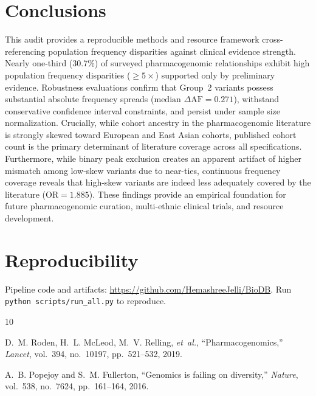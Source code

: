 \documentclass[conference]{IEEEtran}
\begin{document}
\begin{table}[!t]
\section{Conclusions}

This audit provides a reproducible methods and resource framework cross-referencing population frequency disparities against clinical evidence strength.
Nearly one-third (30.7\%) of surveyed pharmacogenomic relationships exhibit high population frequency disparities ($\ge 5\times$) supported only by preliminary evidence.
Robustness evaluations confirm that Group~2 variants possess substantial absolute frequency spreads ($\text{median } \Delta\text{AF} = 0.271$), withstand conservative confidence interval constraints, and persist under sample size normalization.
Crucially, while cohort ancestry in the pharmacogenomic literature is strongly skewed toward European and East Asian cohorts, published cohort count is the primary determinant of literature coverage across all specifications.
Furthermore, while binary peak exclusion creates an apparent artifact of higher mismatch among low-skew variants due to near-ties, continuous frequency coverage reveals that high-skew variants are indeed less adequately covered by the literature ($\text{OR} = 1.885$).
These findings provide an empirical foundation for future pharmacogenomic curation, multi-ethnic clinical trials, and resource development.

\section*{Reproducibility}

Pipeline code and artifacts: \url{https://github.com/HemashreeJelli/BioDB}.
Run \texttt{python scripts/run\_all.py} to reproduce.

\balance
\begin{thebibliography}{10}

D.~M. Roden, H.~L. McLeod, M.~V. Relling, \emph{et~al.},
``Pharmacogenomics,''
\emph{Lancet}, vol.~394, no.~10197, pp.~521--532, 2019.

A.~B. Popejoy and S.~M. Fullerton,
``Genomics is failing on diversity,''
\emph{Nature}, vol.~538, no.~7624, pp.~161--164, 2016.


\end{thebibliography}
\end{table}
\end{document}
